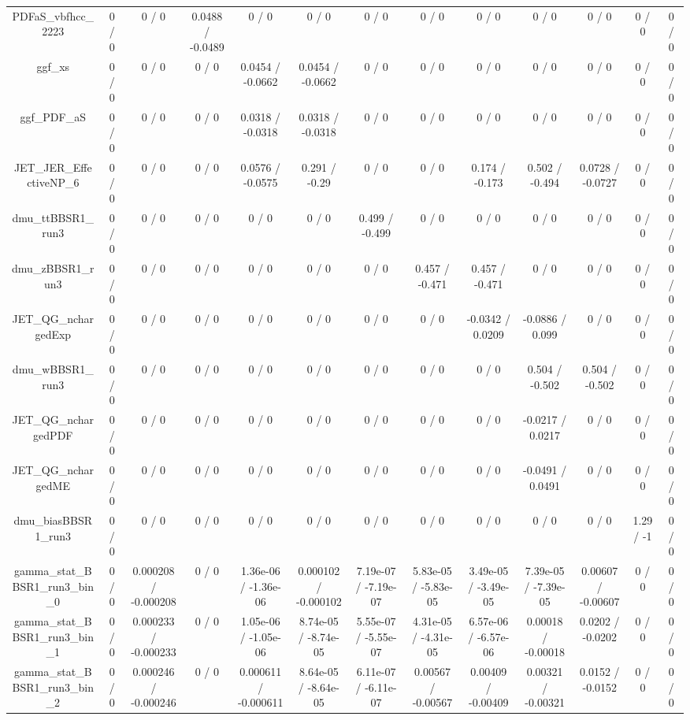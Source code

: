 \documentclass[10pt]{article}
\begin{document}
\begin{table}[htbp]
\begin{center}
\begin{tabular}{|c|c|c|c|c|c|c|c|c|c|c|c|c|}
  PDFaS_vbfhcc_2223 & 0 / 0 & 0 / 0 & 0.0488 / -0.0489 & 0 / 0 & 0 / 0 & 0 / 0 & 0 / 0 & 0 / 0 & 0 / 0 & 0 / 0 & 0 / 0 & 0 / 0 \\ 
  ggf_xs & 0 / 0 & 0 / 0 & 0 / 0 & 0.0454 / -0.0662 & 0.0454 / -0.0662 & 0 / 0 & 0 / 0 & 0 / 0 & 0 / 0 & 0 / 0 & 0 / 0 & 0 / 0 \\ 
  ggf_PDF_aS & 0 / 0 & 0 / 0 & 0 / 0 & 0.0318 / -0.0318 & 0.0318 / -0.0318 & 0 / 0 & 0 / 0 & 0 / 0 & 0 / 0 & 0 / 0 & 0 / 0 & 0 / 0 \\ 
  JET_JER_EffectiveNP_6 & 0 / 0 & 0 / 0 & 0 / 0 & 0.0576 / -0.0575 & 0.291 / -0.29 & 0 / 0 & 0 / 0 & 0.174 / -0.173 & 0.502 / -0.494 & 0.0728 / -0.0727 & 0 / 0 & 0 / 0 \\ 
  dmu_ttBBSR1_run3 & 0 / 0 & 0 / 0 & 0 / 0 & 0 / 0 & 0 / 0 & 0.499 / -0.499 & 0 / 0 & 0 / 0 & 0 / 0 & 0 / 0 & 0 / 0 & 0 / 0 \\ 
  dmu_zBBSR1_run3 & 0 / 0 & 0 / 0 & 0 / 0 & 0 / 0 & 0 / 0 & 0 / 0 & 0.457 / -0.471 & 0.457 / -0.471 & 0 / 0 & 0 / 0 & 0 / 0 & 0 / 0 \\ 
  JET_QG_nchargedExp & 0 / 0 & 0 / 0 & 0 / 0 & 0 / 0 & 0 / 0 & 0 / 0 & 0 / 0 & -0.0342 / 0.0209 & -0.0886 / 0.099 & 0 / 0 & 0 / 0 & 0 / 0 \\ 
  dmu_wBBSR1_run3 & 0 / 0 & 0 / 0 & 0 / 0 & 0 / 0 & 0 / 0 & 0 / 0 & 0 / 0 & 0 / 0 & 0.504 / -0.502 & 0.504 / -0.502 & 0 / 0 & 0 / 0 \\ 
  JET_QG_nchargedPDF & 0 / 0 & 0 / 0 & 0 / 0 & 0 / 0 & 0 / 0 & 0 / 0 & 0 / 0 & 0 / 0 & -0.0217 / 0.0217 & 0 / 0 & 0 / 0 & 0 / 0 \\ 
  JET_QG_nchargedME & 0 / 0 & 0 / 0 & 0 / 0 & 0 / 0 & 0 / 0 & 0 / 0 & 0 / 0 & 0 / 0 & -0.0491 / 0.0491 & 0 / 0 & 0 / 0 & 0 / 0 \\ 
  dmu_biasBBSR1_run3 & 0 / 0 & 0 / 0 & 0 / 0 & 0 / 0 & 0 / 0 & 0 / 0 & 0 / 0 & 0 / 0 & 0 / 0 & 0 / 0 & 1.29 / -1 & 0 / 0 \\ 
  gamma_stat_BBSR1_run3_bin_0 & 0 / 0 & 0.000208 / -0.000208 & 0 / 0 & 1.36e-06 / -1.36e-06 & 0.000102 / -0.000102 & 7.19e-07 / -7.19e-07 & 5.83e-05 / -5.83e-05 & 3.49e-05 / -3.49e-05 & 7.39e-05 / -7.39e-05 & 0.00607 / -0.00607 & 0 / 0 & 0 / 0 \\ 
  gamma_stat_BBSR1_run3_bin_1 & 0 / 0 & 0.000233 / -0.000233 & 0 / 0 & 1.05e-06 / -1.05e-06 & 8.74e-05 / -8.74e-05 & 5.55e-07 / -5.55e-07 & 4.31e-05 / -4.31e-05 & 6.57e-06 / -6.57e-06 & 0.00018 / -0.00018 & 0.0202 / -0.0202 & 0 / 0 & 0 / 0 \\ 
  gamma_stat_BBSR1_run3_bin_2 & 0 / 0 & 0.000246 / -0.000246 & 0 / 0 & 0.000611 / -0.000611 & 8.64e-05 / -8.64e-05 & 6.11e-07 / -6.11e-07 & 0.00567 / -0.00567 & 0.00409 / -0.00409 & 0.00321 / -0.00321 & 0.0152 / -0.0152 & 0 / 0 & 0 / 0 \\ 

\end{tabular}
\end{center}
\end{table}
\end{document}
